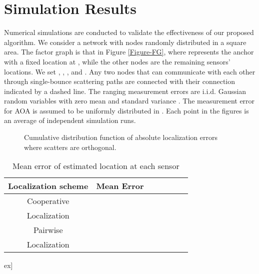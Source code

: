 \documentclass[10pt, twocolumn, final]{IEEEtran}
\begin{document}
\section{Simulation Results}\label{Section:SimulationResults}
Numerical simulations are conducted to validate the effectiveness of our proposed algorithm. We consider a network with  nodes randomly distributed in a  square area. The factor graph is that in Figure \ref{Figure-FG}, where  represents the anchor with a fixed location at , while the other nodes are the remaining sensors' locations. We set , , , and . Any two nodes that can communicate with each other through single-bounce scattering paths are connected with their connection indicated by a dashed line. The ranging measurement errors are i.i.d. Gaussian random variables with zero mean and standard variance . The measurement error for AOA is assumed to be uniformly distributed in . Each point in the figures is an average of  independent simulation runs.

\begin{figure}
  \centering
  \caption{Cumulative distribution function of absolute localization errors where scatters are orthogonal.}\label{Figure-CDF-Ortho}
\end{figure}

\begin{table*}[!t]
\caption[short title]{Mean error of estimated location at each sensor} \label{Table-ME}
\centering
\begin{tabular}{|c||c|c|c|c|c|c|}

\hline Localization scheme & Mean Error &  &  &  &  \\
\hline

Cooperative &  &   &    &    &   \\
\cline{2-6}
Localization &  &  &   &    &  \\
\hline

Pairwise &  &   &    &    &   \\
\cline{2-6}
Localization &  &  &   &    &  \\
\hline

\end{tabular} \3ex]
\end{table*}
\end{document}
